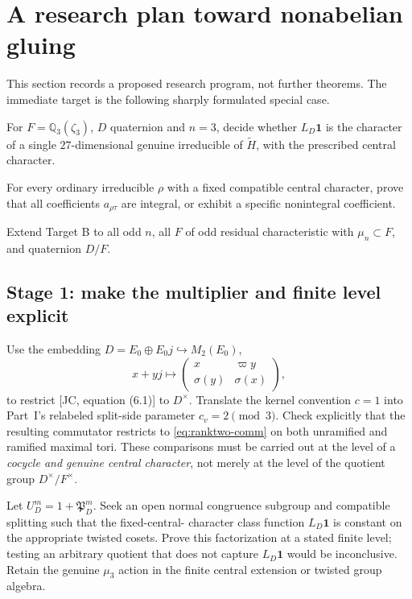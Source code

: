 \documentclass[11pt]{article}
\newcommand{\tH}{\widetilde H}
\theoremstyle{plain}
\theoremstyle{definition}
\begin{document}
\section{A research plan toward nonabelian gluing}\label{sec:plan}
This section records a proposed research program, not further theorems.
The immediate target is the following sharply formulated special case.
\begin{description}[style=nextline]
\item[Target A: the trivial ordinary representation]
For $F=\mathbb Q_3(\zeta_3)$, $D$ quaternion and $n=3$, decide
whether $L_D\mathbf1$ is the character of a single $27$-dimensional
genuine irreducible of $\tH$, with the prescribed central character.
\item[Target B: the full local statement]
For every ordinary irreducible $\rho$ with a fixed compatible central
character, prove that all coefficients $a_{\rho\tau}$ are integral,
or exhibit a specific nonintegral coefficient.
\item[Target C: uniform rank-two theorem]
Extend Target B to all odd $n$, all $F$ of odd residual
characteristic with $\mu_n\subset F$, and quaternion $D/F$.
\end{description}

\subsection{Stage 1: make the multiplier and finite level explicit}
Use the embedding $D=E_0\oplus E_0j\hookrightarrow M_2(E_0)$,
\[
 x+yj\longmapsto
 \begin{pmatrix}x&\varpi y\\\sigma(y)&\sigma(x)\end{pmatrix},
\]
to restrict [JC, equation (6.1)] to $D^\times$.  Translate the
kernel convention $c=1$ into Part~I's relabeled split-side
parameter $c_v=2\pmod3$.  Check explicitly that the resulting
commutator restricts to \eqref{eq:ranktwo-comm} on both unramified
and ramified maximal tori.  These comparisons must be carried out
at the level of a \emph{cocycle and genuine central character},
not merely at the level of the quotient group $D^\times/F^\times$.

Let $U_D^m=1+\mathfrak P_D^m$.  Seek an open normal congruence
subgroup and compatible splitting such that the fixed-central-
character class function $L_D\mathbf1$ is constant on the
appropriate twisted cosets.  Prove this factorization at a stated
finite level; testing an arbitrary quotient that does not capture
$L_D\mathbf1$ would be inconclusive.  Retain the genuine $\mu_3$
action in the finite central extension or twisted group algebra.
\end{document}
